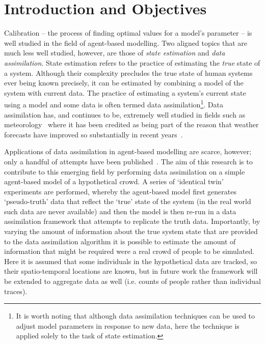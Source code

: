 \documentclass[runningheads]{llncs}
\begin{document}
\section{Introduction and Objectives}

Calibration -- the process of finding optimal values for a model's parameter -- is well studied in the field of agent-based modelling. Two aligned topics that are much less well studied, however, are those of \textit{state estimation} and \textit{data assimilation}. State estimation refers to the practice of estimating the \textit{true} state of a system. Although their complexity precludes the true state of human systems ever being known precisely, it can be estimated by combining a model of the system with current data. The practice of estimating a system's current state using a model and some data is often termed data assimilation\footnote{It is worth noting that although data assimilation techniques can be used to adjust model parameters in response to new data, here the technique is applied solely to the task of state estimation.}.  Data assimilation has, and continues to be, extremely well studied in fields such as meteorology~\cite{kalnay_atmospheric_2003} where it has been credited as being part of the reason that weather forecasts have improved so substantially in recent years~\cite{bauer_quiet_2015}. 

Applications of data assimilation in agent-based modelling are scarce, however; only a handful of attempts have been published~\cite{malleson_understanding_2018,wang_data_2015,ward_dynamic_2016}. The aim of this research is to contribute to this emerging field by performing data assimilation on a simple agent-based model of a hypothetical crowd. A series of `identical twin' experiments are performed, whereby the agent-based model first generates `pseudo-truth' data that reflect the `true' state of the system (in the real world such data are never available) and then the model is then re-run in a data assimilation framework that attempts to replicate the truth data. Importantly, by varying the amount of information about the true system state that are provided to the data assimilation algorithm it is possible to estimate the amount of information that might be required were a real crowd of people to be simulated. Here it is assumed that some individuals in the hypothetical data are tracked, so their spatio-temporal locations are known, but in future work the framework will be extended to aggregate data as well (i.e. counts of people rather than individual traces). 
\end{document}
